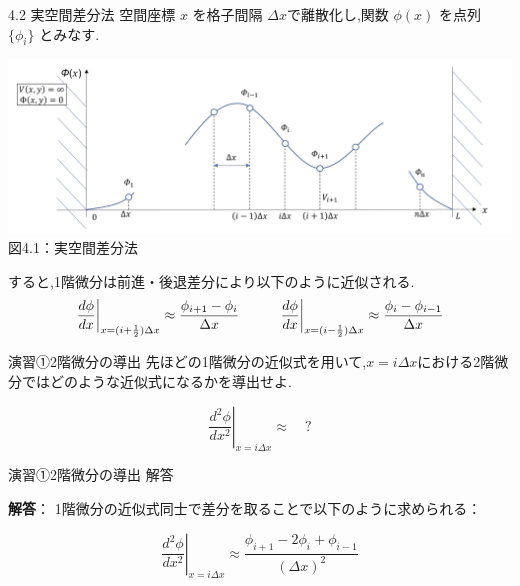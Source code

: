 \documentclass{beamer}
\begin{document}
  \begin{frame}{4.2 実空間差分法}
    空間座標 $x$ を格子間隔 $\Delta x$で離散化し,関数 $\phi(x)$ を点列 $\{\phi_i\}$ とみなす.
    
    
    \begin{center}
      \includegraphics[width=1.1\linewidth]{images/一次元.png} \\
      図4.1：実空間差分法
    \end{center}
    
    すると,1階微分は前進・後退差分により以下のように近似される.
  \[
  \begin{array}{l@{\hspace{1cm}}l}
  \displaystyle
  \left.\frac{d\phi}{dx}\right|_{x = (i+\frac{1}{2})\Delta x}
  \approx \frac{\phi_{i+1} - \phi_{i}}{\Delta x}
  &
  \displaystyle
  \left.\frac{d\phi}{dx}\right|_{x = (i-\frac{1}{2})\Delta x}
  \approx \frac{\phi_{i} - \phi_{i-1}}{\Delta x}
  \end{array}\]
    \end{frame}
    
    \begin{frame}{演習①\quad 2階微分の導出}
    先ほどの1階微分の近似式を用いて,$x = i\Delta x$における2階微分ではどのような近似式になるかを導出せよ.
    
    \bigskip
    $$
    \left. \frac{d^2 \phi}{dx^2} \right|_{x = i\Delta x}
    \approx \quad ?
    $$

    \end{frame}

    \begin{frame}{演習①\quad 2階微分の導出 解答}

      
      \bigskip
      
      \textbf{解答}：
      1階微分の近似式同士で差分を取ることで以下のように求められる：

      $$
      \left. \frac{d^2 \phi}{dx^2} \right|_{x = i\Delta x}
      \approx \frac{\phi_{i+1} - 2\phi_i + \phi_{i-1}}{(\Delta x)^2}
      $$
      \end{frame}
\end{document}
